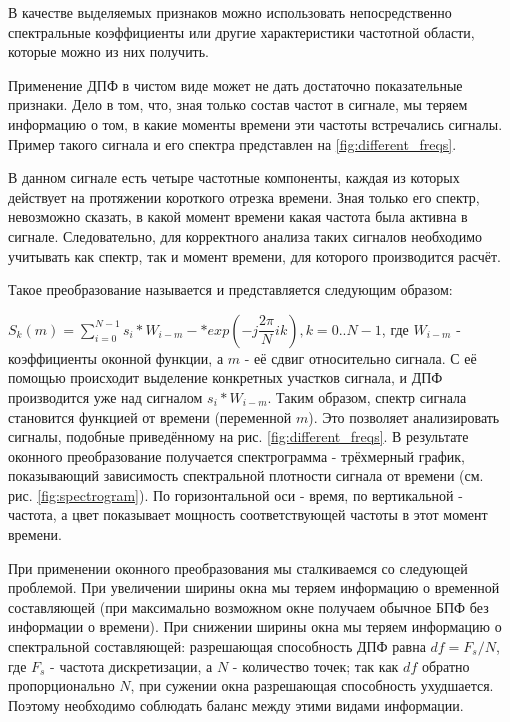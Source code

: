 В качестве выделяемых признаков можно использовать непосредственно спектральные коэффициенты или другие характеристики частотной области, которые можно из них получить.

Применение ДПФ в чистом виде может не дать достаточно показательные признаки. Дело в том, что, зная только состав частот в сигнале, мы теряем информацию о том, в какие моменты времени эти частоты встречались сигналы. Пример такого сигнала и его спектра представлен на \ref{fig:different_freqs}.


В данном сигнале есть четыре частотные компоненты, каждая из которых действует на протяжении короткого отрезка времени. Зная только его спектр, невозможно сказать, в какой момент времени какая частота была активна в сигнале. Следовательно, для корректного анализа таких сигналов необходимо учитывать как спектр, так и момент времени, для которого производится расчёт. 

Такое преобразование называется  и представляется следующим образом:

$S_k(m)=\sum\limits_{i=0}^{N-1} s_i*W_{i-m}-*exp(-j\dfrac{2\pi}{N}ik), k=0..N-1$, где $W_{i-m}$ - коэффициенты оконной функции, а $m$ - её сдвиг относительно сигнала. С её помощью происходит выделение конкретных участков сигнала, и ДПФ производится уже над сигналом $s_i*W_{i-m}$. Таким образом, спектр сигнала становится функцией от времени (переменной $m$). Это позволяет анализировать сигналы, подобные приведённому на рис. \ref{fig:different_freqs}\cite{wavelet_tutorial}. В результате оконного преобразование получается спектрограмма - трёхмерный график, показывающий зависимость спектральной плотности сигнала от времени (см. рис. \ref{fig:spectrogram})\cite{spectrogram}. По горизонтальной оси - время, по вертикальной - частота, а цвет показывает мощность соответствующей частоты в этот момент времени.


При применении оконного преобразования мы сталкиваемся со следующей проблемой. При увеличении ширины окна мы теряем информацию о временной составляющей (при максимально возможном окне получаем обычное БПФ без информации о времени). При снижении ширины окна мы теряем информацию о спектральной составляющей: разрешающая способность ДПФ равна $df=F_s/N$, где $F_s$ - частота дискретизации, а $N$ - количество точек; так как $df$ обратно пропорционально $N$, при сужении окна разрешающая способность ухудшается. Поэтому необходимо соблюдать баланс между этими видами информации. 

